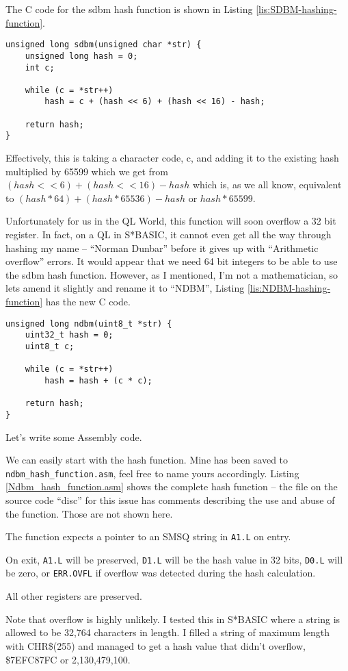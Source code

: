 The C code for the sdbm hash function is shown in Listing \ref{lis:SDBM-hashing-function}.

\begin{lstlisting}[caption={SDBM hashing function},label={lis:SDBM-hashing-function}]
unsigned long sdbm(unsigned char *str) {
    unsigned long hash = 0;
    int c;

    while (c = *str++)
        hash = c + (hash << 6) + (hash << 16) - hash;

    return hash;
}
\end{lstlisting}

Effectively, this is taking a character code, c, and adding it to
the existing hash multiplied by 65599 which we get from $(hash<<6)+(hash<<16)-hash$
which is, as we all know, equivalent to $(hash*64)+(hash*65536)-hash$
or $hash*65599$. 

Unfortunately for us in the QL World, this function will soon overflow
a 32 bit register. In fact, on a QL in S{*}BASIC, it cannot even get
all the way through hashing my name -- ``Norman Dunbar'' before
it gives up with ``Arithmetic overflow'' errors. It would appear
that we need 64 bit integers to be able to use the sdbm hash function.
However, as I mentioned, I'm not a mathematician, so lets amend it
slightly and rename it to ``NDBM'', Listing \ref{lis:NDBM-hashing-function}
has the new C code.

\begin{lstlisting}[caption={NDBM hashing function},label={lis:NDBM-hashing-function}]
unsigned long ndbm(uint8_t *str) {
    uint32_t hash = 0;
    uint8_t c;

    while (c = *str++)
        hash = hash + (c * c);

    return hash;
}
\end{lstlisting}

Let's write some Assembly code. 

We can easily start with the hash function. Mine has been saved to
\texttt{ndbm\_hash\_function.asm}, feel free to name yours accordingly.
Listing \ref{Ndbm_hash_function.asm} shows the complete hash function
-- the file on the source code ``disc'' for this issue has comments
describing the use and abuse of the function. Those are not shown
here.

The function expects a pointer to an SMSQ string in \texttt{A1.L}
on entry. 

On exit, \texttt{A1.L} will be preserved, \texttt{D1.L} will be the
hash value in 32 bits, \texttt{D0.L} will be zero, or \texttt{ERR.OVFL}
if overflow was detected during the hash calculation. 

All other registers are preserved.

Note that overflow is highly unlikely. I tested this in S{*}BASIC
where a string is allowed to be 32,764 characters in length. I filled
a string of maximum length with CHR\$(255) and managed to get a hash
value that didn't overflow, \$7EFC87FC or 2,130,479,100.




